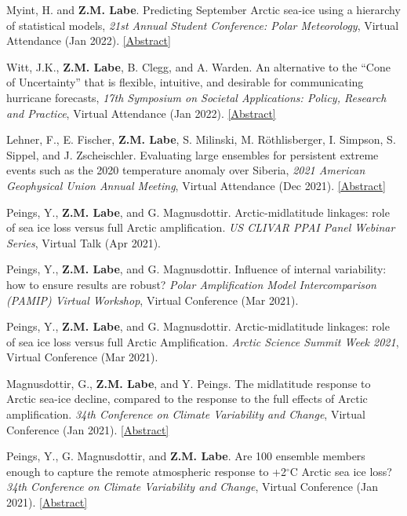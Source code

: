 \documentclass[margin,line,palatino,courier,10pt]{res}
\begin{document}
\begin{resume}
\begin{etaremune}[leftmargin=0in,topsep=0in,parsep=0in]
\item Myint, H. and \textbf{Z.M. Labe}. Predicting September Arctic sea-ice using a hierarchy of statistical models, \textit{21st Annual Student Conference: Polar Meteorology}, Virtual Attendance (Jan 2022). \href{https://ams.confex.com/ams/102ANNUAL/meetingapp.cgi/Paper/391367}{[Abstract]}
\item Witt, J.K., \textbf{Z.M. Labe}, B. Clegg, and A. Warden. An alternative to the ``Cone of Uncertainty'' that is flexible, intuitive, and desirable for communicating hurricane forecasts, \textit{17th Symposium on Societal Applications: Policy, Research and Practice}, Virtual Attendance (Jan 2022). \href{https://ams.confex.com/ams/102ANNUAL/meetingapp.cgi/Paper/395666}{[Abstract]}
\item Lehner, F., E. Fischer, \textbf{Z.M. Labe}, S. Milinski, M. R\"{o}thlisberger, I. Simpson, S. Sippel, and J. Zscheischler. Evaluating large ensembles for persistent extreme events such as the 2020 temperature anomaly over Siberia, \textit{2021 American Geophysical Union Annual Meeting}, Virtual Attendance (Dec 2021). \href{https://agu.confex.com/agu/fm21/meetingapp.cgi/Paper/944312}{[Abstract]}
\item Peings, Y., \textbf{Z.M. Labe}, and G. Magnusdottir. Arctic-midlatitude linkages: role of sea ice loss versus full Arctic amplification. \textit{US CLIVAR PPAI Panel Webinar Series}, Virtual Talk (Apr 2021).
\item Peings, Y., \textbf{Z.M. Labe}, and G. Magnusdottir. Influence of internal variability: how to ensure results are robust? \textit{Polar Amplification Model Intercomparison (PAMIP) Virtual Workshop}, Virtual Conference (Mar 2021).
\item Peings, Y., \textbf{Z.M. Labe}, and G. Magnusdottir. Arctic-midlatitude linkages: role of sea ice loss versus full Arctic Amplification. \textit{Arctic Science Summit Week 2021}, Virtual Conference (Mar 2021).
\item Magnusdottir, G., \textbf{Z.M. Labe}, and Y. Peings. The midlatitude response to Arctic sea-ice decline, compared to the response to the full effects of Arctic amplification. \textit{34th Conference on Climate Variability and Change}, Virtual Conference (Jan 2021). \href{https://ams.confex.com/ams/101ANNUAL/meetingapp.cgi/Paper/382356}{[Abstract]}
\item Peings, Y., G. Magnusdottir, and \textbf{Z.M. Labe}. Are 100 ensemble members enough to capture the remote atmospheric response to +2$^{\circ}$C Arctic sea ice loss? \textit{34th Conference on Climate Variability and Change}, Virtual Conference (Jan 2021). \href{https://ams.confex.com/ams/101ANNUAL/meetingapp.cgi/Paper/382352}{[Abstract]}

\end{etaremune}
\end{resume}
\end{document}
